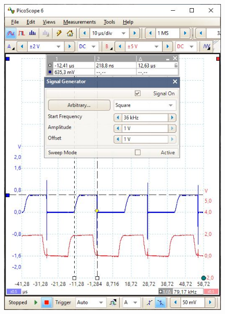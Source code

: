 \begin{figure}[H]
\begin{minipage}{.399\linewidth}
		\includegraphics[width=\textwidth]{figures/results/power_led_driver/36khz.JPG}
		\label{fig:pwr_led_36k}
	\end{minipage}
\end{figure}

